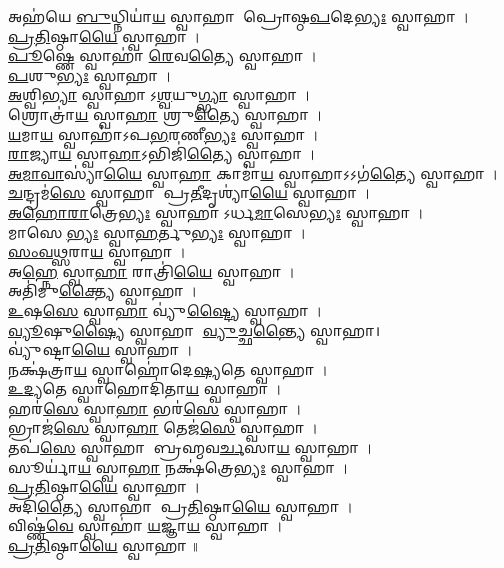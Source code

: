 𑌅𑌹॑𑌯𑍇 \ul{𑌬𑍁}𑌧𑍍𑌨𑌿𑌯𑌾॑\ul{𑌯} 𑌸𑍍𑌵𑌾𑌹𑌾 𑌪𑍍𑌰𑍋𑌷𑍍𑌠\ul{𑌪}𑌦𑍇\ul{𑌭𑍍𑌯𑌃} 𑌸𑍍𑌵𑌾𑌹𑌾।\\
\ul{𑌪𑍍𑌰}\ul{𑌤𑌿}𑌷𑍍𑌠𑌾\ul{𑌯𑍈} 𑌸𑍍𑌵𑌾𑌹𑌾।\\
\ul{𑌪𑍂}𑌷𑍍𑌣𑍇 𑌸𑍍𑌵𑌾𑌹𑌾॑ \ul{𑌰𑍇}𑌵\ul{𑌤𑍍𑌯𑍈} 𑌸𑍍𑌵𑌾𑌹𑌾।\\
\ul{𑌪}𑌶𑍁\ul{𑌭𑍍𑌯𑌃} 𑌸𑍍𑌵𑌾𑌹𑌾।\\
\ul{𑌅}𑌶𑍍𑌵𑌿\ul{𑌭𑍍𑌯𑌾}\ul{} 𑌸𑍍𑌵𑌾𑌹𑌾𑌽\ul{𑌶𑍍𑌵}𑌯𑍁\ul{𑌗𑍍𑌭𑍍𑌯𑌾}\ul{} 𑌸𑍍𑌵𑌾𑌹𑌾।\\
𑌶𑍍𑌰𑍋𑌤𑍍𑌰𑌾॑\ul{𑌯} 𑌸𑍍𑌵𑌾\ul{𑌹𑌾} 𑌶𑍍𑌰𑍁\ul{𑌤𑍍𑌯𑍈} 𑌸𑍍𑌵𑌾𑌹𑌾।\\
\ul{𑌯}𑌮𑌾\ul{𑌯} 𑌸𑍍𑌵𑌾𑌹𑌾॑𑌽𑌪\ul{𑌭}𑌰𑌣𑍀\ul{𑌭𑍍𑌯𑌃} 𑌸𑍍𑌵𑌾𑌹𑌾।\\
\ul{𑌰𑌾}𑌜𑍍𑌯𑌾\ul{𑌯} 𑌸𑍍𑌵𑌾\ul{𑌹𑌾}𑌽𑌭𑌿𑌜𑌿॑\ul{𑌤𑍍𑌯𑍈} 𑌸𑍍𑌵𑌾𑌹𑌾।\\
\ul{𑌅}\ul{𑌮𑌾}\ul{𑌵𑌾}𑌸𑍍𑌯𑌾॑\ul{𑌯𑍈} 𑌸𑍍𑌵𑌾\ul{𑌹𑌾} 𑌕𑌾𑌮𑌾॑\ul{𑌯} 𑌸𑍍𑌵𑌾𑌹𑌾𑌽𑌽𑌗॑\ul{𑌤𑍍𑌯𑍈} 𑌸𑍍𑌵𑌾𑌹𑌾।\\
\ul{𑌚}𑌨𑍍𑌦𑍍𑌰𑌮॑\ul{𑌸𑍇} 𑌸𑍍𑌵𑌾𑌹𑌾 𑌪𑍍𑌰\ul{𑌤𑍀}𑌦𑍃𑌶𑍍𑌯𑌾॑\ul{𑌯𑍈} 𑌸𑍍𑌵𑌾𑌹𑌾।\\
\ul{𑌅}\ul{𑌹𑍋}\ul{𑌰𑌾}𑌤𑍍𑌰𑍇\ul{𑌭𑍍𑌯𑌃} 𑌸𑍍𑌵𑌾𑌹𑌾𑌽𑌰𑍍𑌧\ul{𑌮𑌾}𑌸𑍇\ul{𑌭𑍍𑌯𑌃} 𑌸𑍍𑌵𑌾𑌹𑌾।\\
𑌮𑌾𑌸𑍇\ul{𑌭𑍍𑌯𑌃} 𑌸𑍍𑌵𑌾\ul{𑌹}𑌰𑍍𑌤𑍁\ul{𑌭𑍍𑌯𑌃} 𑌸𑍍𑌵𑌾𑌹𑌾।\\
\ul{𑌸𑌂}\ul{𑌵}\ul{𑌥𑍍𑌸}𑌰𑌾\ul{𑌯} 𑌸𑍍𑌵𑌾𑌹𑌾।\\
𑌅\ul{𑌹𑍍𑌨𑍇} 𑌸𑍍𑌵𑌾\ul{𑌹𑌾} 𑌰𑌾𑌤𑍍𑌰𑌿॑\ul{𑌯𑍈} 𑌸𑍍𑌵𑌾𑌹𑌾।\\
𑌅𑌤𑌿॑𑌮𑍁\ul{𑌕𑍍𑌤𑍍𑌯𑍈} 𑌸𑍍𑌵𑌾𑌹𑌾।\\
\ul{𑌉}𑌷\ul{𑌸𑍇} 𑌸𑍍𑌵𑌾\ul{𑌹𑌾} 𑌵𑍍𑌯𑍁॑\ul{𑌷𑍍𑌟𑍍𑌯𑍈} 𑌸𑍍𑌵𑌾𑌹𑌾।\\
\ul{𑌵𑍍𑌯𑍂}𑌷𑍁\ul{𑌷𑍍𑌯𑍈} 𑌸𑍍𑌵𑌾𑌹𑌾 \ul{𑌵𑍍𑌯𑍁}𑌚𑍍𑌛\ul{𑌨𑍍𑌤𑍍𑌯𑍈} 𑌸𑍍𑌵𑌾𑌹𑌾।\\
𑌵𑍍𑌯𑍁॑𑌷𑍍𑌟𑌾\ul{𑌯𑍈} 𑌸𑍍𑌵𑌾𑌹𑌾।\\
𑌨𑌕𑍍𑌷॑𑌤𑍍𑌰𑌾\ul{𑌯} 𑌸𑍍𑌵𑌾𑌹𑍋॑𑌦𑍇\ul{𑌷𑍍𑌯}𑌤𑍇 𑌸𑍍𑌵𑌾𑌹𑌾।\\
\ul{𑌉}\ul{𑌦𑍍𑌯}𑌤𑍇 𑌸𑍍𑌵𑌾𑌹𑍋𑌦𑌿॑𑌤𑌾\ul{𑌯} 𑌸𑍍𑌵𑌾𑌹𑌾।\\
𑌹𑌰॑\ul{𑌸𑍇} 𑌸𑍍𑌵𑌾\ul{𑌹𑌾} 𑌭𑌰॑\ul{𑌸𑍇} 𑌸𑍍𑌵𑌾𑌹𑌾।\\
𑌭𑍍𑌰𑌾𑌜॑\ul{𑌸𑍇} 𑌸𑍍𑌵𑌾\ul{𑌹𑌾} 𑌤𑍇𑌜॑\ul{𑌸𑍇} 𑌸𑍍𑌵𑌾𑌹𑌾।\\
𑌤𑌪॑\ul{𑌸𑍇} 𑌸𑍍𑌵𑌾𑌹𑌾 𑌬𑍍𑌰𑌹𑍍𑌮𑌵\ul{𑌰𑍍𑌚}𑌸𑌾\ul{𑌯} 𑌸𑍍𑌵𑌾𑌹𑌾।\\
𑌸𑍂𑌰𑍍𑌯𑌾॑\ul{𑌯} 𑌸𑍍𑌵𑌾\ul{𑌹𑌾} 𑌨𑌕𑍍𑌷॑𑌤𑍍𑌰𑍇\ul{𑌭𑍍𑌯𑌃} 𑌸𑍍𑌵𑌾𑌹𑌾।\\
\ul{𑌪𑍍𑌰}\ul{𑌤𑌿}𑌷𑍍𑌠𑌾\ul{𑌯𑍈} 𑌸𑍍𑌵𑌾𑌹𑌾।\\
𑌅𑌦𑌿॑\ul{𑌤𑍍𑌯𑍈} 𑌸𑍍𑌵𑌾𑌹𑌾 𑌪𑍍𑌰\ul{𑌤𑌿}𑌷𑍍𑌠𑌾\ul{𑌯𑍈} 𑌸𑍍𑌵𑌾𑌹𑌾।\\
𑌵𑌿𑌷𑍍𑌣॑\ul{𑌵𑍇} 𑌸𑍍𑌵𑌾𑌹𑌾॑ \ul{𑌯}𑌜𑍍𑌞𑌾\ul{𑌯} 𑌸𑍍𑌵𑌾𑌹𑌾।\\
\ul{𑌪𑍍𑌰}\ul{𑌤𑌿}𑌷𑍍𑌠𑌾\ul{𑌯𑍈} 𑌸𑍍𑌵𑌾𑌹𑌾॥\\

